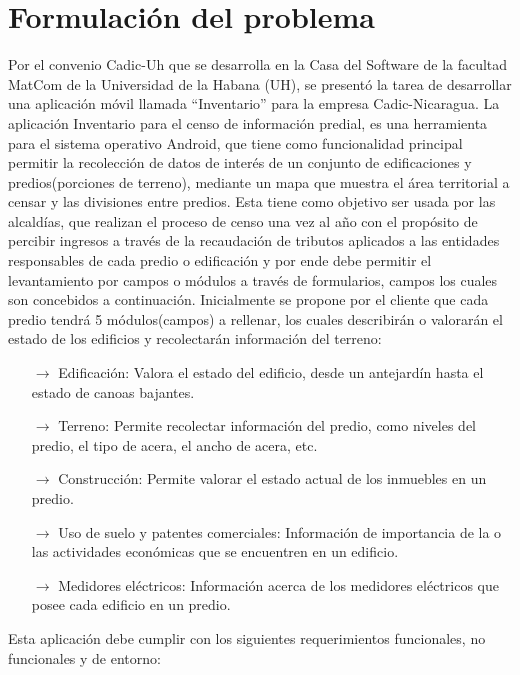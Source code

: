 \section{Formulación del problema}\label{section:formulacionProblema}
Por el convenio Cadic-Uh que se desarrolla en la Casa del Software de la facultad
MatCom de la Universidad de la Habana (UH), se presentó la tarea de desarrollar
una aplicación móvil llamada “Inventario” para la empresa Cadic-Nicaragua.
La aplicación Inventario para el censo de información predial, es una herramienta
para el sistema operativo Android, que tiene como funcionalidad principal permitir la
recolección de datos de interés de un conjunto de edificaciones y predios(porciones
de terreno), mediante un mapa que muestra el área territorial a censar y las
divisiones entre predios. Esta tiene como objetivo ser usada por las alcaldías, que
realizan el proceso de censo una vez al año con el propósito de percibir ingresos a
través de la recaudación de tributos aplicados a las entidades responsables de cada
predio o edificación y por ende debe permitir el levantamiento por campos o
módulos a través de formularios, campos los cuales son concebidos a continuación.
Inicialmente se propone por el cliente que cada predio tendrá 5 módulos(campos) a rellenar, los cuales describirán o valorarán
el estado de los edificios y recolectarán información del terreno:
\begin{itemize}
      \item[$\rightarrow$] Edificación: Valora el estado del edificio, desde un antejardín hasta el
            estado de canoas bajantes.
      \item[$\rightarrow$] Terreno: Permite recolectar información del predio, como niveles del predio,
            el tipo de acera, el ancho de acera, etc.
      \item[$\rightarrow$] Construcción: Permite valorar el estado actual de los inmuebles en un
            predio.
      \item[$\rightarrow$] Uso de suelo y patentes comerciales: Información de importancia de la o
            las actividades económicas que se encuentren en un edificio.
      \item[$\rightarrow$] Medidores eléctricos: Información acerca de los medidores eléctricos que
            posee cada edificio en un predio.
\end{itemize}
Esta aplicación debe cumplir con los siguientes requerimientos funcionales, no
funcionales y de entorno:
